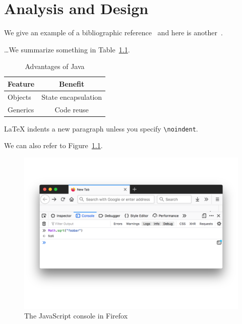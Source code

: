 \chapter{Analysis and Design}
\label{chap:analysis-and-design}

We give an example of a bibliographic
reference~\cite{Lindholm-Yellin:99} and here is another~\cite{Cormen-al:01}.

\bigskip

\dots We summarize something in Table~\ref{tab:java-advantages}.

\begin{table}[tb] %
  \centering
  \begin{tabular}{l c}  %
    Feature  & Benefit
    \\\hline
    Objects  & State encapsulation
    \\
    Generics & Code reuse
  \end{tabular}
  \caption{Advantages of Java}
  \label{tab:java-advantages}
\end{table}

\bigskip

\noindent
LaTeX indents a new paragraph unless you specify \lstinline{\noindent}.

\bigskip

We can also refer to Figure~\ref{fig:firefox-js-console}.

\begin{figure}[tb] %
  \centering
  \includegraphics[width=.9\linewidth]{assets/firefox-js-console}
  \caption{The JavaScript console in Firefox }
  \label{fig:firefox-js-console}
\end{figure}
